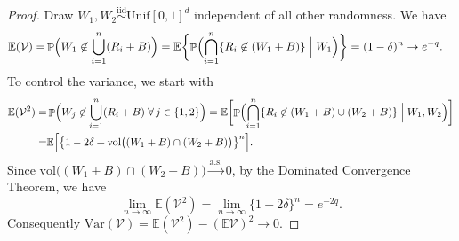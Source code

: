 \documentclass[11pt]{article}
\DeclareMathOperator{\Prob}{\mathbb{P}}
\newcommand{\E}{\mathbb{E}}
\newcommand{\vol}{\mathrm{vol}}
\newcommand{\var}{\mathrm{Var}}
\newcommand{\iid}{\stackrel{\mathrm{iid}}\sim}
\begin{document}
\begin{proof}
    Draw $W_1, W_2 \iid \mathrm{Unif}[0,1]^d$ independent of all other randomness. We have
    \begin{align*}
        \E (\mathcal{V}) =& \Prob\Bigl(W_1 \not\in \bigcup_{i = 1}^n (R_i + B)\Bigr) =\E \biggl\{\Prob\Bigl(\bigcap_{i = 1}^n\{R_i \not\in (W_1 + B) \} \Bigm| W_1\Bigr)\biggr\} = (1 - \delta)^n \to e^{-q}.
    \end{align*}
    To control the variance, we start with
    \begin{align}
        \E (\mathcal{V}^2) =& \Prob\Bigl(W_j \not\in \bigcup_{i = 1}^n (R_i+B) \; \forall \, j\in\{1,2\}\Bigr) = \E \biggl[\Prob\Bigl(\bigcap_{i = 1}^n\{R_i \not\in (W_1+B) \cup (W_2+B)\} \Bigm| W_1, W_2\Bigr)\biggr] \nonumber\\ 
        =& \E \Bigl[\bigl\{1 -2\delta+ \vol\bigl((W_1+B)\cap (W_2+B)\bigr)\bigr\}^n\Bigr].\label{Eq:VarianceIntermediate}
    \end{align}
    Since $\vol\bigl((W_1+B)\cap (W_2+B)\bigr) \xrightarrow{\mathrm{a.s.}} 0$, by the Dominated Convergence Theorem, we have  
    \[
    \lim_{n\to\infty} \E(\mathcal{V}^2) = \lim_{n\to\infty}\{1 - 2\delta\}^n = e^{-2q}.
    \]
    Consequently $\var(\mathcal{V}) = \E(\mathcal{V}^2) - (\E \mathcal{V})^2\to 0$. 


\end{proof}
\end{document}
